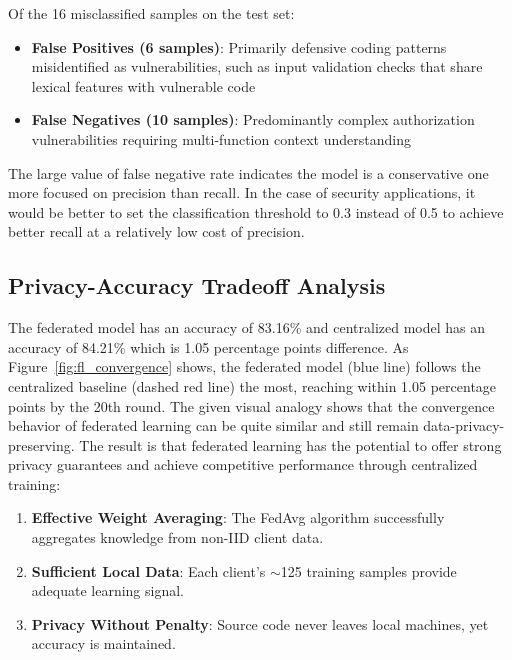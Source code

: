 \documentclass[pdflatex,sn-mathphys-num]{sn-jnl}
\theoremstyle{thmstyleone}%
\theoremstyle{thmstyletwo}%
\theoremstyle{thmstylethree}%
\begin{document}
Of the 16 misclassified samples on the test set:
\begin{itemize}
    \item \textbf{False Positives (6 samples)}: Primarily defensive coding patterns misidentified as vulnerabilities, such as input validation checks that share lexical features with vulnerable code
    \item \textbf{False Negatives (10 samples)}: Predominantly complex authorization vulnerabilities requiring multi-function context understanding
\end{itemize}

The large value of false negative rate indicates the model is a conservative one more focused on precision than recall. In the case of security applications, it would be better to set the classification threshold to 0.3 instead of 0.5 to achieve better recall at a relatively low cost of precision.

\subsection{Privacy-Accuracy Tradeoff Analysis}\label{subsec:tradeoff}

The federated model has an accuracy of 83.16\% and centralized model has an accuracy of 84.21\% which is 1.05 percentage points difference. As Figure~\ref{fig:fl_convergence} shows, the federated model (blue line) follows the centralized baseline (dashed red line) the most, reaching within 1.05 percentage points by the 20th round. The given visual analogy shows that the convergence behavior of federated learning can be quite similar and still remain data-privacy-preserving. The result is that federated learning has the potential to offer strong privacy guarantees and achieve competitive performance through centralized training:


\begin{enumerate}
    \item \textbf{Effective Weight Averaging}: The FedAvg algorithm successfully aggregates knowledge from non-IID client data.
    
    \item \textbf{Sufficient Local Data}: Each client's $\sim$125 training samples provide adequate learning signal.
    
    \item \textbf{Privacy Without Penalty}: Source code never leaves local machines, yet accuracy is maintained.
\end{enumerate}
\end{document}
